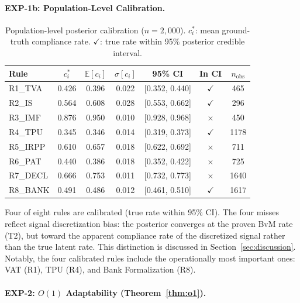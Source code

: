 \documentclass[letterpaper]{article}
\begin{document}
\paragraph{EXP-1b: Population-Level Calibration.}

\begin{table}[H]
\centering
\caption{Population-level posterior calibration ($n=2{,}000$).
         $c_i^*$: mean ground-truth compliance rate.
         $\checkmark$: true rate within 95\% posterior credible interval.}
\label{tab:calibration}
\renewcommand{\arraystretch}{1.2}
\begin{tabular}{lcccccc}
\toprule
\textbf{Rule} & $c_i^*$ & $\mathbb{E}[c_i]$ & $\sigma[c_i]$
  & \textbf{95\% CI} & \textbf{In CI} & $n_{\mathrm{obs}}$ \\
\midrule
R1\_TVA  & 0.426 & 0.396 & 0.022 & [0.352, 0.440] & $\checkmark$ & 465 \\
R2\_IS   & 0.564 & 0.608 & 0.028 & [0.553, 0.662] & $\checkmark$ & 296 \\
R3\_IMF  & 0.876 & 0.950 & 0.010 & [0.928, 0.968] & $\times$     & 450 \\
R4\_TPU  & 0.345 & 0.346 & 0.014 & [0.319, 0.373] & $\checkmark$ & 1178 \\
R5\_IRPP & 0.610 & 0.657 & 0.018 & [0.622, 0.692] & $\times$     & 711 \\
R6\_PAT  & 0.440 & 0.386 & 0.018 & [0.352, 0.422] & $\times$     & 725 \\
R7\_DECL & 0.666 & 0.753 & 0.011 & [0.732, 0.773] & $\times$     & 1640 \\
R8\_BANK & 0.491 & 0.486 & 0.012 & [0.461, 0.510] & $\checkmark$ & 1617 \\
\bottomrule
\end{tabular}
\end{table}

Four of eight rules are calibrated (true rate within 95\% CI). The
four misses reflect signal discretization bias: the posterior converges
at the proven BvM rate (T2), but toward the apparent compliance rate
of the discretized signal rather than the true latent rate. This
distinction is discussed in Section~\ref{sec:discussion}. Notably,
the four calibrated rules include the operationally most important
ones: VAT (R1), TPU (R4), and Bank Formalization (R8).

\paragraph{EXP-2: $O(1)$ Adaptability (Theorem~\ref{thm:o1}).}
\end{document}
